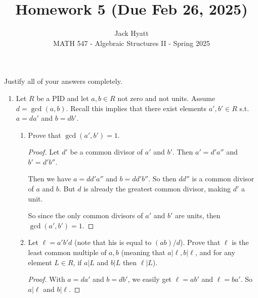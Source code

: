 \documentclass[12pt]{article}
\begin{document}
	
	
	
	\title{Homework 5 (Due Feb 26, 2025)}
	\author{Jack Hyatt\\ %
		MATH 547 - Algebraic Structures II - Spring 2025} 
	
	\maketitle
	
	Justify all of your answers completely.\\
	
	
	\medskip 
	
	\begin{enumerate}
		\item Let $R$ be a PID and let $a,b \in R$ not zero and not units. Assume $d = \gcd(a,b)$. Recall this implies that there exist elements $a',b' \in R$ s.t. $a=da'$ and $b=db'$.
		\begin{enumerate}
			\item Prove that $\gcd(a',b') = 1$.
			\begin{proof}
				Let $d'$ be a common divisor of $a'$ and $b'$. Then $a' = d'a''$ and $b' = d'b''$.
				
				Then we have $a = dd'a''$ and $b = dd'b''$. So then $dd''$ is a common divisor of $a$ and $b$. But $d$ is already the greatest common divisor, making $d'$ a unit.
				
				So since the only common divisors of $a'$ and $b'$ are units, then $\gcd(a',b') = 1$.
			\end{proof}
			
			
			\item Let $\ell = a'b'd$ (note that his is equal to $(ab)/d$). Prove that $\ell$ is the least common multiple of $a,b$ (meaning that $a|\ell,b|\ell$, and for any element $L \in R$, if $a|L$ and $b|L$ then $\ell|L$).
			\begin{proof}
				With $a = da'$ and $b = db'$, we easily get $\ell = ab'$ and $\ell = ba'$. So $a|\ell$ and $b|\ell$.
				

\end{proof}
\end{enumerate}
\end{enumerate}
\end{document}
